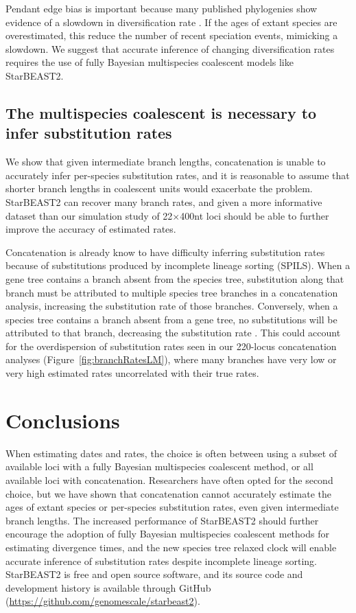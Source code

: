 \documentclass[12pt]{article}
\begin{document}
Pendant edge bias is important because many published phylogenies show evidence
of a slowdown in diversification rate \citep{Moen2014190}. If the ages of extant
species are overestimated, this reduce the number of recent speciation events,
mimicking a slowdown. We suggest that accurate inference of changing
diversification rates requires the use of fully Bayesian multispecies coalescent
models like StarBEAST2.

\subsection*{The multispecies coalescent is necessary to infer substitution rates}

We show that given intermediate branch lengths, concatenation is unable to
accurately infer per-species substitution rates, and it is reasonable to assume
that shorter branch lengths in coalescent units would exacerbate the problem.
StarBEAST2 can recover many branch rates, and given a more informative dataset
than our simulation study of 22$\times$400nt loci should be able to further improve
the accuracy of estimated rates.

Concatenation is already know to have difficulty inferring substitution rates
because of substitutions produced by incomplete lineage sorting (SPILS). When a
gene tree contains a branch absent from the species tree, substitution along
that branch must be attributed to multiple species tree branches in a
concatenation analysis, increasing the substitution rate of those branches.
Conversely, when a species tree contains a branch absent from a gene tree, no
substitutions will be attributed to that branch, decreasing the substitution
rate \citep{Mendes28022016}. This could account for the overdispersion of
substitution rates seen in our 220-locus concatenation analyses
(Figure~\ref{fig:branchRatesLM}), where many branches have very low or very high
estimated rates uncorrelated with their true rates.

\section*{Conclusions}

When estimating dates and rates, the choice is often between using a subset of
available loci with a fully Bayesian multispecies coalescent method, or all
available loci with concatenation. Researchers have often opted for the second
choice, but we have shown that concatenation cannot accurately estimate the ages
of extant species or per-species substitution rates, even given intermediate
branch lengths. The increased performance of StarBEAST2 should further encourage
the adoption of fully Bayesian multispecies coalescent methods for estimating
divergence times, and the new species tree relaxed clock will enable accurate
inference of substitution rates despite incomplete lineage sorting. StarBEAST2
is free and open source software, and its source code and development history is
available through GitHub (\url{https://github.com/genomescale/starbeast2}).
\end{document}
